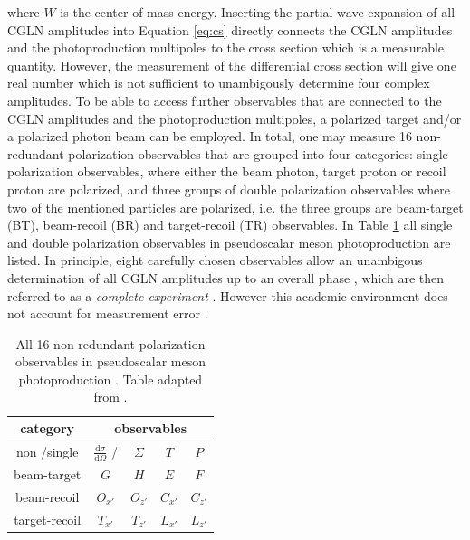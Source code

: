 where $W$ is the center of mass energy. Inserting the partial wave expansion of all CGLN amplitudes into Equation \eqref{eq:cs} directly connects the CGLN amplitudes and the photoproduction multipoles to the cross section which is a measurable quantity. However, the measurement of the differential cross section will give one real number which is not sufficient to unambigously determine four complex amplitudes. To be able to access further observables that are connected to the CGLN amplitudes and the photoproduction multipoles, a polarized target and/or a polarized photon beam can be employed. In total, one may measure 16 non-redundant polarization observables \cite{san} that are grouped into four categories: single polarization observables, where either the beam photon, target proton or recoil proton are polarized, and three groups of double polarization observables where two of the mentioned particles are polarized, i.e. the three groups are beam-target (BT), beam-recoil (BR) and target-recoil (TR) observables. In Table \ref{tab:pol} all single and double polarization observables in pseudoscalar meson photoproduction are listed. In principle, eight carefully chosen observables allow an unambigous determination of all CGLN amplitudes up to an overall phase \cite{chiang}, which are then referred to as a \emph{complete experiment} \cite{chiang,san}. However this academic environment does not account for measurement error \cite{yannick_phd}.
\begin{table}[htbp]
	\centering
	\begin{tabular}{c|cccc}
	\toprule
		\textbf{category}&\multicolumn{4}{c}{\textbf{observables}}\\
		\hline
		non /single & $\frac{\text{d}\sigma}{\text{d}\Omega}$ / & $\Sigma$ &$T$&$P$\\
		beam-target&$G$&$H$&$E$&$F$\\
		beam-recoil&$O_{x'}$&$O_{z'}$&$C_{x'}$&$C_{z'}$\\
		target-recoil&$T_{x'}$&$T_{z'}$&$L_{x'}$&$L_{z'}$\\
		\bottomrule
	\end{tabular}
\caption{All 16 non redundant polarization observables in pseudoscalar meson photoproduction \cite{san}. Table adapted from \cite{farahmsc}.}
\label{tab:pol}
\end{table}

